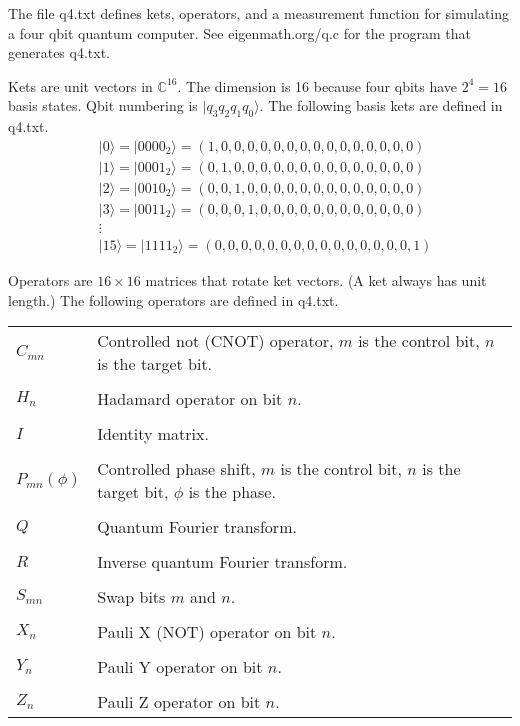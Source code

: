 \documentclass[12pt]{article}
\begin{document}
\noindent
The file q4.txt defines kets, operators, and a measurement function
for simulating a four qbit quantum computer.
See eigenmath.org/q.c for the program that generates q4.txt.

\bigskip
\noindent
Kets are unit vectors in $\mathbb{C}^{16}$.
The dimension is 16 because four qbits have $2^4=16$ basis states.
Qbit numbering is $|q_3 q_2 q_1 q_0\rangle$.
The following basis kets are defined in q4.txt.
\begin{align*}
&|0\rangle=|0000_2\rangle=(1,0,0,0,0,0,0,0,0,0,0,0,0,0,0,0)
\\
&|1\rangle=|0001_2\rangle=(0,1,0,0,0,0,0,0,0,0,0,0,0,0,0,0)
\\
&|2\rangle=|0010_2\rangle=(0,0,1,0,0,0,0,0,0,0,0,0,0,0,0,0)
\\
&|3\rangle=|0011_2\rangle=(0,0,0,1,0,0,0,0,0,0,0,0,0,0,0,0)
\\
&\vdots
\\
&|15\rangle=|1111_2\rangle=(0,0,0,0,0,0,0,0,0,0,0,0,0,0,0,1)
\end{align*}

\noindent
Operators are $16\times16$ matrices that rotate ket vectors.
(A ket always has unit length.)
The following operators are defined in q4.txt.

\bigskip
\begin{tabular}{l l}
$C_{mn}$ & Controlled not (CNOT) operator, $m$ is the control bit, $n$ is the target bit.
\\
\\
$H_n$ & Hadamard operator on bit $n$.
\\
\\
$I$ & Identity matrix.
\\
\\
$P_{mn}(\phi)$ & Controlled phase shift, $m$ is the control bit, $n$ is the target bit, $\phi$ is the phase.
\\
\\
$Q$ & Quantum Fourier transform.
\\
\\
$R$ & Inverse quantum Fourier transform.
\\
\\
$S_{mn}$ & Swap bits $m$ and $n$.
\\
\\
$X_n$ & Pauli X (NOT) operator on bit $n$.
\\
\\
$Y_n$ & Pauli Y operator on bit $n$.
\\
\\
$Z_n$ & Pauli Z operator on bit $n$.
\end{tabular}
\end{document}
